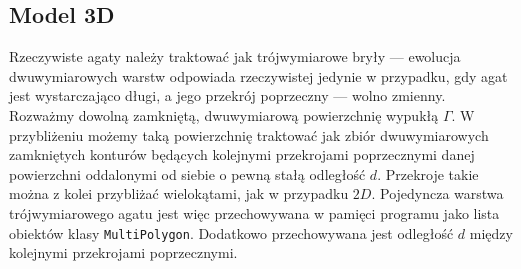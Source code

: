 \documentclass{article}
\begin{document}
\subsection{Model 3D}
Rzeczywiste agaty należy traktować jak trójwymiarowe bryły --- ewolucja dwuwymiarowych warstw odpowiada rzeczywistej jedynie w przypadku, gdy agat jest wystarczająco długi, a jego przekrój poprzeczny --- wolno zmienny. Rozważmy dowolną zamkniętą, dwuwymiarową powierzchnię wypukłą $\Gamma$. W przybliżeniu możemy taką powierzchnię traktować jak zbiór dwuwymiarowych zamkniętych konturów będących kolejnymi przekrojami poprzecznymi danej powierzchni oddalonymi od siebie o pewną stałą odległość $d$. Przekroje takie można z kolei przybliżać wielokątami, jak w przypadku $2D$. Pojedyncza warstwa trójwymiarowego agatu jest więc przechowywana w pamięci programu jako lista obiektów klasy \texttt{MultiPolygon}. Dodatkowo przechowywana jest odległość $d$ między kolejnymi przekrojami poprzecznymi.
\end{document}
